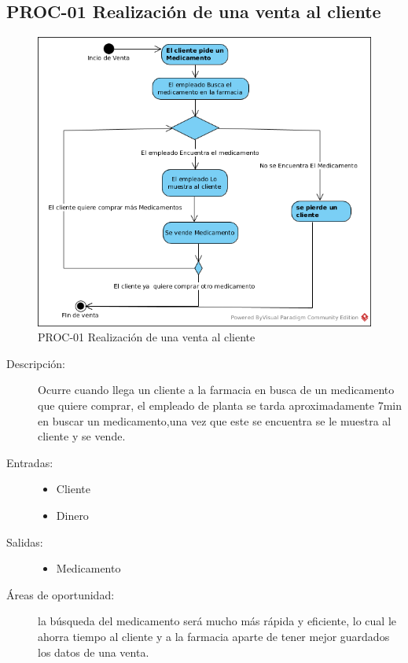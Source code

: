 \subsection{PROC-01 Realización de una venta al cliente}

\begin{figure}[htbp]
	\begin{center}
		\includegraphics[width=.7\textwidth]{images/AS-TOprocVenta}
		\caption{PROC-01 Realización de una venta al cliente}
		\label{fig:proceso1}
	\end{center}
\end{figure}

\begin{description}
	\item[Descripción:] Ocurre cuando llega un cliente a la farmacia en busca de un medicamento que quiere comprar, el empleado de planta se tarda aproximadamente 7min en buscar un medicamento,una vez que este se encuentra se le muestra al cliente y se vende. 
	\item[Entradas:] \cdtEmpty
        \begin{itemize}
			\item Cliente
			\item Dinero
        \end{itemize}
	\item[Salidas:] \cdtEmpty
        \begin{itemize}
			\item Medicamento
        \end{itemize}	
    \item[Áreas de oportunidad:]la búsqueda del medicamento será mucho más rápida y eficiente, lo cual le ahorra tiempo al cliente y a la farmacia aparte de tener mejor guardados los datos de una venta.
\end{description}
